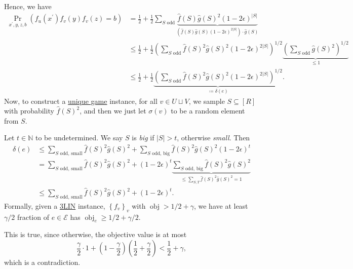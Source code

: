 Hence, we have
\[
	\begin{split}
		\Pr_{x^\prime, y, z, b}(f_u(x^\prime ) f_v(y) f_v(z) = b)
		&= \frac{1}{2} + \frac{1}{2} \sum_{\text{\(S\) odd}} \underbrace{\hat{f} (S) \hat{g} (S)^{2} (1-2\epsilon ) ^{\vert S \vert }}_{(\hat{f} (S)\hat{g} (S) (1-2\epsilon )^{2 \vert S \vert })\cdot \hat{g} (S)}\\
		&\leq \frac{1}{2} + \frac{1}{2} \left( \sum_{\text{\(S\) odd}} \hat{f} (S)^2 \hat{g} (S)^2 (1-2\epsilon )^{2 \vert S \vert } \right)^{1/2} \underbrace{\left( \sum_{\text{\(S\) odd}} \hat{g} (S)^2 \right) ^{1 / 2}}_{\leq 1}\\
		&\leq \frac{1}{2} + \frac{1}{2} \underbrace{\left( \sum_{\text{\(S\) odd}} \hat{f} (S)^2 \hat{g} (S)^2 (1-2\epsilon )^{2 \vert S \vert } \right) ^{1 / 2}}_{\coloneqq \delta (e)}.
	\end{split}
\]
Now, to construct a \hyperref[prb:unique-game]{unique game} instance, for all \(v\in U \sqcup V\), we sample \(S \subseteq [R]\) with probability \(\hat{f} (S)^2\), and then we just let \(\sigma (v)\) to be a random element from \(S\).

\begin{intuition}

\end{intuition}

Let \(t\in \mathbb{N} \) to be undetermined. We say \(S\) is \emph{big} if \(\vert S \vert > t\), otherwise \emph{small}. Then
\[
	\begin{split}
		\delta (e)
		&\leq \sum_{\text{\(S\) odd, small}} \hat{f} (S)^2 \hat{g} (S)^2 + \sum_{\text{\(S\) odd, big}} \hat{f} (S)^2 \hat{g} (S)^2 (1-2\epsilon )^t\\
		&= \sum_{\text{\(S\) odd, small}} \hat{f} (S)^2 \hat{g} (S)^2 + (1-2\epsilon )^t \underbrace{\sum_{\text{\(S\) odd, big}} \hat{f} (S)^2 \hat{g} (S)^2}_{\leq \sum_{S, T} \hat{f} (S)^2 \hat{g} (S)^2 = 1}\\
		&\leq \sum_{\text{\(S\) odd, small}} \hat{f} (S)^2 \hat{g} (S)^2 + (1-2\epsilon )^t.
	\end{split}
\]
Formally, given a \hyperref[prb:max-3LIN]{3LIN} instance, \(\left\{ f_v \right\} _{v}\) with \(\mathop{\mathrm{obj}} > 1/2 + \gamma \), we have at least \(\gamma / 2\) fraction of \(e\in \mathcal{E} \) has \(\mathop{\mathrm{obj}}_e \geq 1 / 2 + \gamma /2\).

\begin{note}
	This is true, since otherwise, the objective value is at most
	\[
		\frac{\gamma}{2}\cdot 1 + \left( 1 - \frac{\gamma}{2} \right) \left( \frac{1}{2}+ \frac{\gamma}{2} \right)  < \frac{1}{2} + \gamma ,
	\]
	which is a contradiction.
\end{note}

